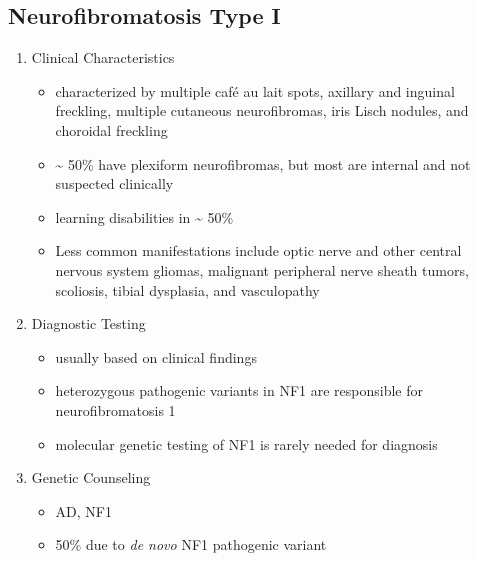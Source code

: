 \documentclass[12pt]{scrartcl}
\begin{document}
\subsection{Neurofibromatosis Type I}
\label{sec:org90af521}
\begin{enumerate}
\item Clinical Characteristics
\label{sec:org74c1099}
\begin{itemize}
\item characterized by multiple café au lait spots, axillary and inguinal freckling, multiple cutaneous neurofibromas, iris Lisch nodules, and choroidal freckling
\item \textasciitilde{} 50\% have plexiform neurofibromas, but most are internal and not suspected clinically
\item learning disabilities in \textasciitilde{} 50\%
\item Less common manifestations include optic nerve and other central
nervous system gliomas, malignant peripheral nerve sheath tumors,
scoliosis, tibial dysplasia, and vasculopathy
\end{itemize}
\item Diagnostic Testing
\label{sec:org8fbf169}
\begin{itemize}
\item usually based on clinical findings
\item heterozygous pathogenic variants in NF1 are responsible for neurofibromatosis 1
\item molecular genetic testing of NF1 is rarely needed for diagnosis
\end{itemize}
\item Genetic Counseling
\label{sec:orgf45720f}
\begin{itemize}
\item AD, NF1
\item 50\% due to \emph{de novo} NF1 pathogenic variant
\end{itemize}
\end{enumerate}
\end{document}
